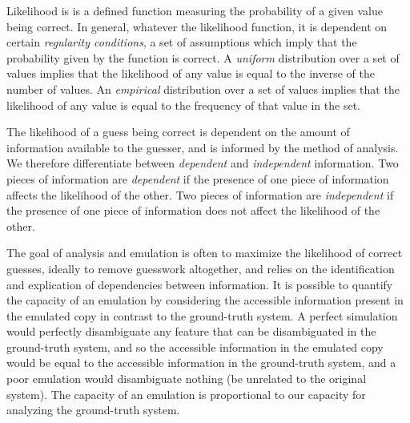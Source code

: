 Likelihood is is a defined function measuring the probability of a given value being correct.
In general, whatever the likelihood function, it is dependent on certain \emph{regularity conditions}, a set of assumptions which imply that the probability given by the function is correct.
A \emph{uniform} distribution over a set of values implies that the likelihood of any value is equal to the inverse of the number of values.
An \emph{empirical} distribution over a set of values implies that the likelihood of any value is equal to the frequency of that value in the set.

The likelihood of a guess being correct is dependent on the amount of information available to the guesser, and is informed by the method of analysis.
We therefore differentiate between \emph{dependent} and \emph{independent} information.
Two pieces of information are \emph{dependent} if the presence of one piece of information affects the likelihood of the other.
Two pieces of information are \emph{independent} if the presence of one piece of information does not affect the likelihood of the other.

The goal of analysis and emulation is often to maximize the likelihood of correct guesses, ideally to remove guesswork altogether, and relies on the identification and explication of dependencies between information.
It is possible to quantify the capacity of an emulation by considering the accessible information present in the emulated copy in contrast to the ground-truth system.
A perfect simulation would perfectly disambiguate any feature that can be disambiguated in the ground-truth system, and so the accessible information in the emulated copy would be equal to the accessible information in the ground-truth system, and a poor emulation would disambiguate nothing (be unrelated to the original system).
The capacity of an emulation is proportional to our capacity for analyzing the ground-truth system.
